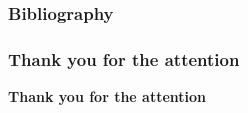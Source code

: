 \documentclass[]{beamer}
\begin{document}
    \begin{frame}[allowframebreaks]
        \frametitle{Bibliography}
        \tiny
        
        
    \end{frame}

	{
    \begin{frame}
        \frametitle{Thank you for the attention}
        \begin{center}
        	\vskip 2cm
            \textbf{Thank you for the attention}
        \end{center}
    \end{frame}
    }
\end{document}
